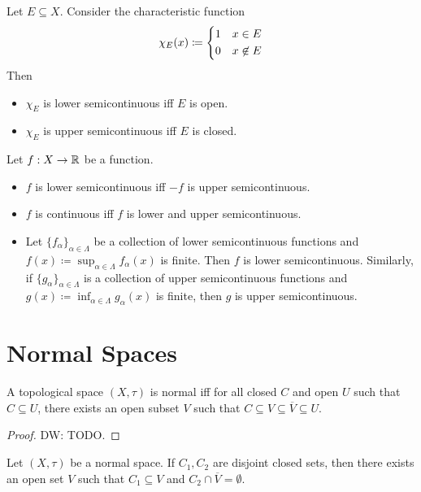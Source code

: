 \documentclass[screen]{techreport}
\numberwithin{equation}{section}
\newcommand{\diw}[1]{{\color{Red} DW: #1}}
\begin{document}
\begin{example}\label{Exa:IndicatorsSemiCont}
	Let $E \subseteq X$.
	Consider the characteristic function
	\[
	\chi_E(x) \coloneqq
	\begin{dcases}
 		1 & x \in E \\
 		0 & x \not\in E
 	\end{dcases}
	\]
	Then
	\begin{itemize}
		\item $\chi_E$ is lower semicontinuous iff $E$ is open.
		\item $\chi_E$ is upper semicontinuous iff $E$ is closed.
	\end{itemize} 	
\end{example}

\begin{lemma}\label{Lem:SomeFactsAboutSemiCont}
	Let $f : X \to \mathbb{R}$ be a function.
	\begin{itemize}
		\item $f$ is lower semicontinuous iff $-f$ is upper semicontinuous.
		\item $f$ is continuous iff $f$ is lower and upper semicontinuous.
		\item Let $\{f_\alpha\}_{\alpha \in \Lambda}$ be a collection of lower semicontinuous functions and $f(x) \coloneqq \sup_{\alpha \in \Lambda} f_{\alpha}(x)$ is finite.
		Then $f$ is lower semicontinuous.
		Similarly, if $\{g_\alpha\}_{\alpha \in \Lambda}$ is a collection of upper semicontinuous functions and $g(x) \coloneqq \inf_{\alpha \in \Lambda} g_\alpha(x)$ is finite, then $g$ is upper semicontinuous.
	\end{itemize}
\end{lemma}

\section{Normal Spaces}

\begin{lemma}\label{Lem:NormalIffNeighborContainClosure}
	A topological space $(X,\tau)$ is normal iff for all closed $C$ and open $U$ such that $C \subseteq U$, there exists an open subset $V$ such that $C \subseteq V \subseteq \overline{V} \subseteq U$.
\end{lemma}
\begin{proof}
	\diw{TODO.}
\end{proof}

\begin{corollary}\label{Cor:NormalIffNeighborContainClosure}
	Let $(X,\tau)$ be a normal space.
	If $C_1,C_2$ are disjoint closed sets, then there exists an open set $V$ such that $C_1 \subseteq V$ and $C_2 \cap \overline{V} =\emptyset$.
\end{corollary}
\end{document}
